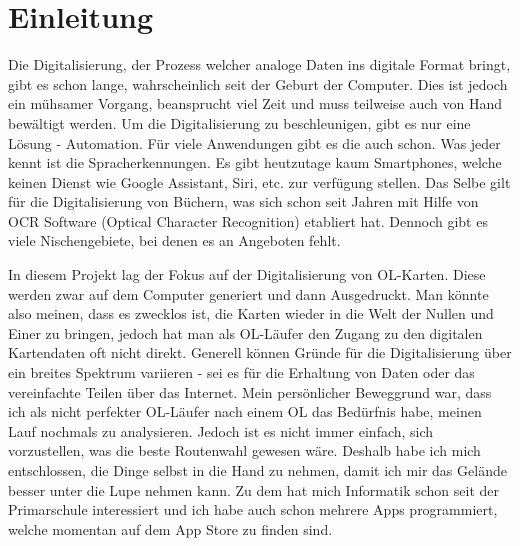 \section{Einleitung}

Die Digitalisierung, der Prozess welcher analoge Daten ins digitale Format bringt, gibt es schon lange, wahrscheinlich seit der Geburt der Computer. Dies ist jedoch ein mühsamer Vorgang, beansprucht viel Zeit und muss teilweise auch von Hand bewältigt werden. Um die Digitalisierung  zu beschleunigen, gibt es nur eine Lösung - Automation. Für viele Anwendungen gibt es die auch schon. Was jeder kennt ist  die Spracherkennungen. Es gibt heutzutage kaum Smartphones, welche keinen Dienst wie Google Assistant, Siri, etc. zur verfügung stellen. Das Selbe gilt für die Digitalisierung von Büchern, was sich schon seit Jahren mit Hilfe von OCR Software (Optical Character Recognition) etabliert hat. Dennoch gibt es viele Nischengebiete, bei denen es an Angeboten fehlt.

In diesem Projekt lag der Fokus auf der Digitalisierung von OL-Karten. Diese werden zwar auf dem Computer generiert und dann Ausgedruckt. Man könnte also meinen, dass es zwecklos ist, die Karten wieder in die Welt der Nullen und Einer zu bringen, jedoch hat man als OL-Läufer den Zugang zu den digitalen Kartendaten oft nicht direkt. Generell können Gründe für die Digitalisierung über ein breites Spektrum variieren - sei es für die Erhaltung von Daten oder das vereinfachte Teilen über das Internet. Mein persönlicher Beweggrund war, dass ich als nicht perfekter OL-Läufer nach einem OL das Bedürfnis habe, meinen Lauf nochmals zu analysieren. Jedoch ist es nicht immer einfach, sich vorzustellen, was die beste Routenwahl gewesen wäre. Deshalb habe ich mich entschlossen, die Dinge selbst in die Hand zu nehmen, damit ich mir das Gelände besser unter die Lupe nehmen kann. Zu dem hat mich Informatik schon seit der Primarschule interessiert und ich habe auch schon mehrere Apps programmiert, welche momentan auf dem App Store zu finden sind.